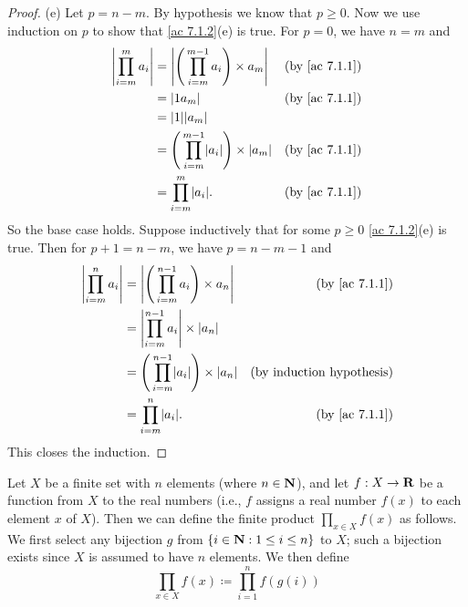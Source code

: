 \begin{proof}{(e)}
  Let \(p = n - m\).
  By hypothesis we know that \(p \geq 0\).
  Now we use induction on \(p\) to show that \cref{ac 7.1.2}(e) is true.
  For \(p = 0\), we have \(n = m\) and
  \begin{align*}
    \abs{\prod_{i = m}^m a_i} & = \abs{\Bigg(\prod_{i = m}^{m - 1} a_i\Bigg) \times a_m}       & \text{(by \cref{ac 7.1.1})} \\
                              & = \abs{1a_m}                                                   & \text{(by \cref{ac 7.1.1})} \\
                              & = \abs{1}\abs{a_m}                                                                           \\
                              & = \Bigg(\prod_{i = m}^{m - 1} \abs{a_i}\Bigg) \times \abs{a_m} & \text{(by \cref{ac 7.1.1})} \\
                              & = \prod_{i = m}^m \abs{a_i}.                                   & \text{(by \cref{ac 7.1.1})}
  \end{align*}
  So the base case holds.
  Suppose inductively that for some \(p \geq 0\) \cref{ac 7.1.2}(e) is true.
  Then for \(p + 1 = n - m\), we have \(p = n - m - 1\) and
  \begin{align*}
    \abs{\prod_{i = m}^n a_i} & = \abs{\Bigg(\prod_{i = m}^{n - 1} a_i\Bigg) \times a_n}       & \text{(by \cref{ac 7.1.1})}      \\
                              & = \abs{\prod_{i = m}^{n - 1} a_i} \times \abs{a_n}                                                \\
                              & = \Bigg(\prod_{i = m}^{n - 1} \abs{a_i}\Bigg) \times \abs{a_n} & \text{(by induction hypothesis)} \\
                              & = \prod_{i = m}^n \abs{a_i}.                                   & \text{(by \cref{ac 7.1.1})}
  \end{align*}
  This closes the induction.
\end{proof}

\begin{additional corollary}\label{ac 7.1.3}
Let \(X\) be a finite set with \(n\) elements (where \(n \in \mathbf{N}\)), and let \(f : X \to \mathbf{R}\) be a function from \(X\) to the real numbers
(i.e., \(f\) assigns a real number \(f(x)\) to each element \(x\) of \(X\)).
Then we can define the finite product \(\prod_{x \in X} f(x)\) as follows.
We first select any bijection \(g\) from \(\{i \in \mathbf{N} : 1 \leq i \leq n\}\) to \(X\);
such a bijection exists since \(X\) is assumed to have \(n\) elements.
We then define
\[
  \prod_{x \in X} f(x) \coloneqq \prod_{i = 1}^n f(g(i))
\]
\end{additional corollary}


